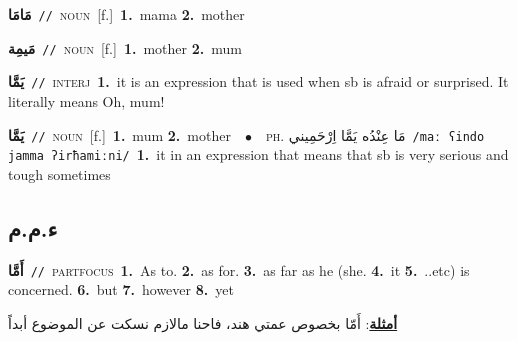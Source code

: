 \documentclass[10pt,a4paper,twoside]{article} %
\begin{document}
\begin{multicols}{2}
{\setlength\topsep{0pt}\textbf{\foreignlanguage{arabic}{مَامَا}}\ {\color{gray}\texttt{//}\color{black}}\ \textsc{noun}\ [f.]\ \textbf{1.}~mama  \textbf{2.}~mother\ } \vspace{2mm}

{\setlength\topsep{0pt}\textbf{\foreignlanguage{arabic}{مَيمِة}}\ {\color{gray}\texttt{//}\color{black}}\ \textsc{noun}\ [f.]\ \textbf{1.}~mother  \textbf{2.}~mum\ } \vspace{2mm}

{\setlength\topsep{0pt}\textbf{\foreignlanguage{arabic}{يَمَّا}}\ {\color{gray}\texttt{//}\color{black}}\ \textsc{interj}\ \textbf{1.}~it is an expression that is used when sb is afraid or surprised. It literally means Oh, mum!\ } \vspace{2mm}

{\setlength\topsep{0pt}\textbf{\foreignlanguage{arabic}{يَمَّا}}\ {\color{gray}\texttt{//}\color{black}}\ \textsc{noun}\ [f.]\ \textbf{1.}~mum  \textbf{2.}~mother\ \ $\bullet$\ \ \textsc{ph.} \color{gray} \foreignlanguage{arabic}{مَا عِنْدُه يَمَّا اِرْحَمِيني}\color{black}\ {\color{gray}\texttt{/{\sffamily maː ʕindo jamma ʔirħamiːni}/}\color{black}}\ \textbf{1.}~it in an expression that means that sb is very serious and tough sometimes\ } \vspace{2mm}

\vspace{-3mm}
\subsection*{\color{blue}\foreignlanguage{arabic}{ء.م.م}\color{blue}{ (ntws)}} 

{\setlength\topsep{0pt}\textbf{\foreignlanguage{arabic}{أَمَّا}}\ {\color{gray}\texttt{//}\color{black}}\ \textsc{part\textunderscore focus}\ \textbf{1.}~As to.  \textbf{2.}~as for.  \textbf{3.}~as far as he (she.  \textbf{4.}~it  \textbf{5.}~..etc) is concerned.  \textbf{6.}~but  \textbf{7.}~however  \textbf{8.}~yet\  \begin{flushright}\color{gray}\foreignlanguage{arabic}{\textbf{\underline{\foreignlanguage{arabic}{أمثلة}}}: أَمّا بخصوص عمتي هند، فاحنا مالازم نسكت عن الموضوع أبداً}\end{flushright}\color{black}} \vspace{2mm}


\end{multicols}
\end{document}
